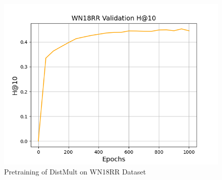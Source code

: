 \begin{figure}
\begin{minipage}{.3\textwidth}
    \end{minipage}
    \begin{minipage}{.3\textwidth}
      \centering
      \includegraphics[width=0.9\linewidth]{figures/results/WN18RR/Pretraining/DistMult/pretrain_wn18rr_hit10.png}
    \end{minipage}%
    \caption{Pretraining of DistMult on WN18RR Dataset}
    \label{fig:test}
\end{figure}

